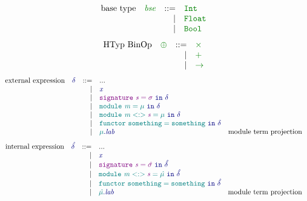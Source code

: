 \documentclass[12pt,fleqn]{article}
\newcommand{\green}[1]{\textcolor{green}{#1}}
\newcommand{\blue}[1]{\textcolor{blue}{#1}}
\newcommand{\purple}[1]{\textcolor{purple}{#1}}
\newcommand{\teal}[1]{\textcolor{teal}{#1}}
\newcommand{\greentt}[1]{\green{\mathtt{#1}}}
\newcommand{\bluett}[1]{\blue{\mathtt{#1}}}
\newcommand{\purplett}[1]{\purple{\mathtt{#1}}}
\newcommand{\tealtt}[1]{\teal{\mathtt{#1}}}
\newcommand{\greenit}[1]{\green{\mathit{#1}}}
\newcommand{\blueit}[1]{\blue{\mathit{#1}}}
\newcommand{\purpleit}[1]{\purple{\mathit{#1}}}
\newcommand{\tealit}[1]{\teal{\mathit{#1}}}
\newcommand{\uexp}[1][]{\blueit{\delta#1}}
\renewcommand{\exp}[1][]{\blueit{\hat{\delta#1}}}
\newcommand{\uexpvar}[1][]{\blueit{x#1}}
\newcommand{\expvar}[1][]{\blueit{x#1}}
\newcommand{\usig}[1][]{\purpleit{\sigma#1}}
\newcommand{\sig}[1][]{\purpleit{\hat{\sigma#1}}}
\newcommand{\usigvar}[1][]{\purpleit{s#1}}
\newcommand{\sigvar}[1][]{\purpleit{s#1}}
\newcommand{\umod}[1][]{\tealit{\mu#1}}
\renewcommand{\mod}[1][]{\tealit{\hat{\mu#1}}}
\newcommand{\umodvar}[1][]{\tealit{m#1}}
\newcommand{\modvar}[1][]{\tealit{m#1}}
\newcommand{\lab}[1][]{\mathit{lab#1}}
\newcommand{\Int}{\greentt{Int}}
\newcommand{\Float}{\greentt{Float}}
\newcommand{\Bool}{\greentt{Bool}}
\newcommand{\uLetSig}[2]{\purplett{signature~#1=#2}\bluett{~in~\uexp}}
\newcommand{\LetSig}[2]{\purplett{signature~#1=#2}\bluett{~in~\exp}}
\newcommand{\uLetMod}[2]{\tealtt{module~#1=#2}\bluett{~in~\uexp}}
\newcommand{\LetMod}[2]{\tealtt{module~#1=#2}\bluett{~in~\exp}}
\newcommand{\uLetFunctor}[2]{\tealtt{functor~#1=#2}\bluett{~in~\uexp}}
\newcommand{\LetFunctor}[2]{\tealtt{functor~#1=#2}\bluett{~in~\exp}}
\newcommand{\uModTermPrj}[2]{\bluett{#1.#2}}
\newcommand{\ModTermPrj}[2]{\bluett{#1.#2}}
\begin{document}
\[\begin{array}{rcrlr}
    \textrm{base type} & \greenit{bse} & ::=
                       & \Int \\
                       && \vert & \Float \\
                       && \vert & \Bool \\
\end{array}\]
\[\begin{array}{rcrlr}
    \textrm{HTyp BinOp} & \greenit{\oplus} & ::=
                   & \greentt{\times} \\
                   && \vert & \greentt{+} \\
                   && \vert & \greentt{\rightarrow}\\
\end{array}\]
\[\begin{array}{rcrlr}
    \textrm{external expression} & \uexp & ::=
                                 & ... \\
                                 && \vert & \uexpvar \\
                                 && \vert & \uLetSig{\usigvar}{\usig} \\
                                 && \vert & \uLetMod{\umodvar}{\umod} \\
                                 && \vert & \uLetMod{\umodvar <:> \usigvar}{\umod} \\
                                 && \vert & \uLetFunctor{something}{something} \\
                                 && \vert & \uModTermPrj{\umod}{\lab} & \textrm{module term projection} \\
\end{array}\]
\[\begin{array}{rcrlr}
    \textrm{internal expression} & \exp & ::=
                                 & ... \\
                                 && \vert &  \expvar \\
                                 && \vert & \LetSig{\sigvar}{\sig} \\
                                 && \vert & \LetMod{\modvar <:> \sigvar}{\mod} \\
                                 && \vert & \LetFunctor{something}{something} \\
                                 && \vert & \ModTermPrj{\mod}{\lab} & \textrm{module term projection} \\
\end{array}\]
\end{document}
